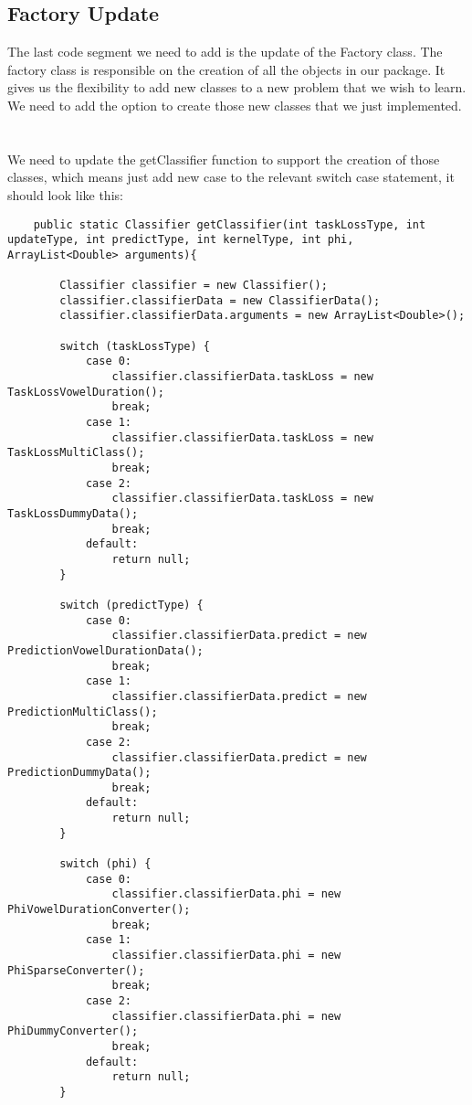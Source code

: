\documentclass[11pt, oneside]{article}   	%
\begin{document}
\subsection{Factory Update}
The last code segment we need to add is the update of the Factory class. The factory class is responsible on the creation of all the objects in our package. It gives us the flexibility to add new classes to a new problem that we wish to learn.
We need to add the option to create those new classes that we just implemented. \\ \\ \\
We need to update the getClassifier function to support the creation of those classes, which means just add new case to the relevant switch case statement,  it should look like this: 
\begin{lstlisting}
	public static Classifier getClassifier(int taskLossType, int updateType, int predictType, int kernelType, int phi, ArrayList<Double> arguments){
		
		Classifier classifier = new Classifier();
        classifier.classifierData = new ClassifierData();
        classifier.classifierData.arguments = new ArrayList<Double>();
		
		switch (taskLossType) {
			case 0:
                classifier.classifierData.taskLoss = new TaskLossVowelDuration();
				break;
			case 1:
                classifier.classifierData.taskLoss = new TaskLossMultiClass();
				break;
            case 2:
                classifier.classifierData.taskLoss = new TaskLossDummyData();
                break;
			default:
				return null;
		}

        switch (predictType) {
            case 0:
                classifier.classifierData.predict = new PredictionVowelDurationData();
                break;
            case 1:
                classifier.classifierData.predict = new PredictionMultiClass();
                break;
            case 2:
                classifier.classifierData.predict = new PredictionDummyData();
                break;
            default:
                return null;
        }

        switch (phi) {
            case 0:
                classifier.classifierData.phi = new PhiVowelDurationConverter();
                break;
            case 1:
                classifier.classifierData.phi = new PhiSparseConverter();
                break;
            case 2:
                classifier.classifierData.phi = new PhiDummyConverter();
                break;
            default:
                return null;
        }


\end{lstlisting}
\end{document}
